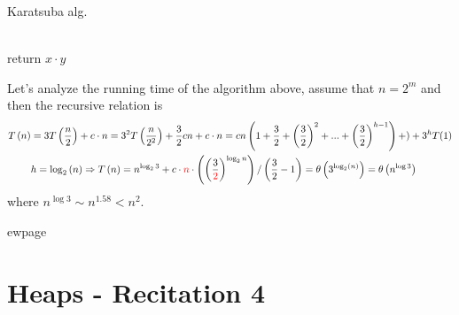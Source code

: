 \begin{algbox}{Karatsuba alg.}
\begin{algorithm}[H]
\SetAlgoLined
{}
 \ \\ 
    { return \(x \cdot y\) } 
 \ \\ 
 
\end{algorithm}
\end{algbox}
Let's analyze the running time of the algorithm above, assume that \(n = 2^{m}\) and then the recursive relation is 
\begin{equation*}
    \begin{split}
        T\left(n\right) & = 3T\left(\frac{n}{2}\right) + c\cdot n = 3^2 T\left(\frac{n}{2^2}\right) + \frac{3}{2}cn + c\cdot n = cn\left(1 + \frac{3}{2} + \left(\frac{3}{2}\right)^2 + ...  + \left(\frac{3}{2}\right)^{h-1} \right) + ) + 3^{h}T(1) \\
        & h = \log_{2}\left(n\right) \Rightarrow T\left(n\right) = n^{\log_{2}{3}} +  c\cdot \textcolor{red}{n}\cdot \left(\left(\frac{3}{\textcolor{red}{2}}\right)^{\log_{2}{n}}\right) / \left(\frac{3}{2} - 1\right) = \theta \left( 3^{\log_{2}(n)} \right) =  \theta \left( n^{\log 3} \right)  
    \end{split}
\end{equation*}
where \(n^{\log 3}  \sim n^{1.58} < n^2 \).




ewpage\section{Heaps - Recitation 4} 
\author{Correctness, Loop Invariant And Heaps.}


